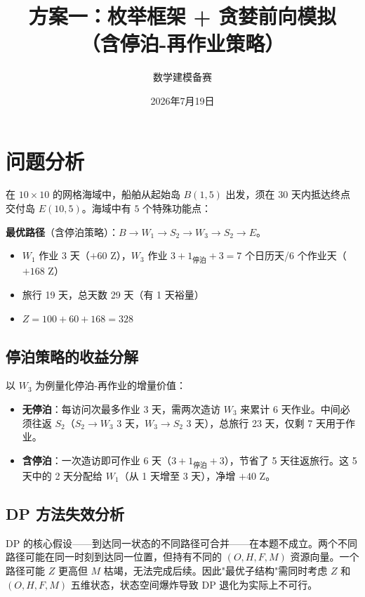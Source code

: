 \documentclass[12pt,a4paper]{ctexart}
\title{\textbf{方案一：枚举框架 + 贪婪前向模拟\\（含停泊-再作业策略）}}
\author{数学建模备赛}
\date{2026年7月19日}
\theoremstyle{definition}
\begin{document}
\maketitle

\section{问题分析}

在 $10\times 10$ 的网格海域中，船舶从起始岛 $B(1,5)$ 出发，须在 $30$ 天内抵达终点交付岛 $E(10,5)$。海域中有 $5$ 个特殊功能点：



\textbf{最优路径}（含停泊策略）：$B\to W_1\to S_2\to W_3\to S_2\to E$。

\begin{itemize}
  \item $W_1$ 作业 3 天（$+60$ Z），$W_3$ 作业 $3+1_{\text{停泊}}+3=7$ 个日历天/6 个作业天（$+168$ Z）
  \item 旅行 19 天，总天数 29 天（有 1 天裕量）
  \item $Z=100+60+168=328$
\end{itemize}

\subsection{停泊策略的收益分解}

以 $W_3$ 为例量化停泊-再作业的增量价值：
\begin{itemize}
  \item \textbf{无停泊}：每访问次最多作业 3 天，需两次造访 $W_3$ 来累计 6 天作业。中间必须往返 $S_2$（$S_2\!\to\!W_3$ 3 天，$W_3\!\to\!S_2$ 3 天），总旅行 23 天，仅剩 7 天用于作业。
  \item \textbf{含停泊}：一次造访即可作业 6 天（$3+1_{\text{停泊}}+3$），节省了 5 天往返旅行。这 5 天中的 2 天分配给 $W_1$（从 1 天增至 3 天），净增 $+40$ Z。
\end{itemize}

\subsection{DP 方法失效分析}

DP 的核心假设——到达同一状态的不同路径可合并——在本题不成立。两个不同路径可能在同一时刻到达同一位置，但持有不同的 $(O,H,F,M)$ 资源向量。一个路径可能 $Z$ 更高但 $M$ 枯竭，无法完成后续。因此"最优子结构"需同时考虑 $Z$ 和 $(O,H,F,M)$ 五维状态，状态空间爆炸导致 DP 退化为实际上不可行。
\end{document}
